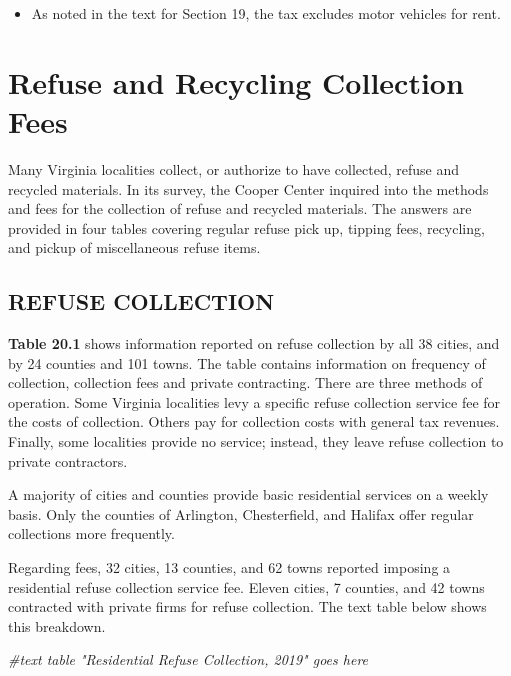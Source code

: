 \documentclass[
]{book}
\newenvironment{Shaded}{\begin{snugshade}}{\end{snugshade}}
\newcommand{\CommentTok}[1]{\textcolor[rgb]{0.56,0.35,0.01}{\textit{#1}}}
\providecommand{\tightlist}{%
  \setlength{\itemsep}{0pt}\setlength{\parskip}{0pt}}
\begin{document}
\begin{itemize}
\tightlist
\item
  As noted in the text for Section 19, the tax excludes motor vehicles for rent.
\end{itemize}

\hypertarget{refuse-and-recycling-collection-fees}{%
\chapter{Refuse and Recycling Collection Fees}\label{refuse-and-recycling-collection-fees}}

Many Virginia localities collect, or authorize to have collected, refuse and recycled materials. In its survey, the Cooper Center inquired into the methods and fees for the collection of refuse and recycled materials. The answers are provided in four tables covering regular refuse pick up, tipping fees, recycling, and pickup of miscellaneous refuse items.

\hypertarget{refuse-collection}{%
\section{REFUSE COLLECTION}\label{refuse-collection}}

\textbf{Table 20.1} shows information reported on refuse collection by all 38 cities, and by 24 counties and 101 towns. The table contains information on frequency of collection, collection fees and private contracting. There are three methods of operation. Some Virginia localities levy a specific refuse collection service fee for the costs of collection. Others pay for collection costs with general tax revenues. Finally, some localities provide no service; instead, they leave refuse collection to private contractors.

A majority of cities and counties provide basic residential services on a weekly basis. Only the counties of Arlington, Chesterfield, and Halifax offer regular collections more frequently.

Regarding fees, 32 cities, 13 counties, and 62 towns reported imposing a residential refuse collection service fee. Eleven cities, 7 counties, and 42 towns contracted with private firms for refuse collection. The text table below shows this breakdown.

\begin{Shaded}
\begin{Highlighting}[]
\CommentTok{\#text table "Residential Refuse Collection, 2019" goes here}
\end{Highlighting}
\end{Shaded}
\end{document}
